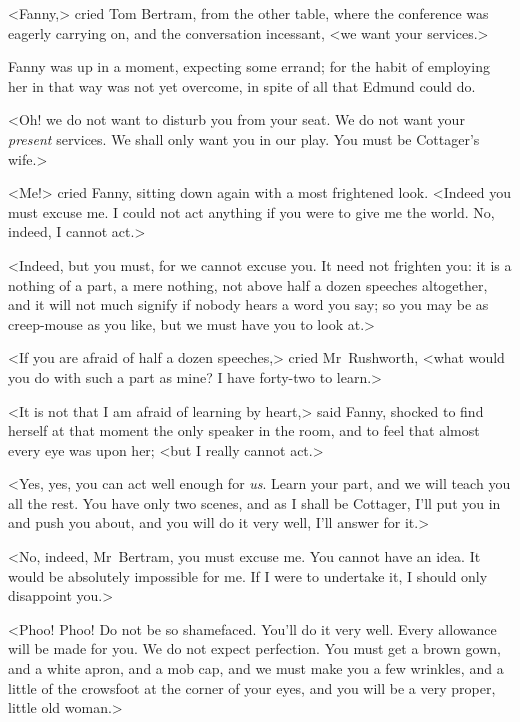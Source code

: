 <Fanny,> cried Tom Bertram, from the other table, where the conference was eagerly carrying on, and the conversation incessant, <we want your services.>

Fanny was up in a moment, expecting some errand; for the habit of employing her in that way was not yet overcome, in spite of all that Edmund could do.

<Oh! we do not want to disturb you from your seat. We do not want your \textit{present}  services. We shall only want you in our play. You must be Cottager's wife.>

<Me!> cried Fanny, sitting down again with a most frightened look. <Indeed you must excuse me. I could not act anything if you were to give me the world. No, indeed, I cannot act.>

<Indeed, but you must, for we cannot excuse you. It need not frighten you: it is a nothing of a part, a mere nothing, not above half a dozen speeches altogether, and it will not much signify if nobody hears a word you say; so you may be as creep-mouse as you like, but we must have you to look at.>

<If you are afraid of half a dozen speeches,> cried Mr~Rushworth, <what would you do with such a part as mine? I have forty-two to learn.>

<It is not that I am afraid of learning by heart,> said Fanny, shocked to find herself at that moment the only speaker in the room, and to feel that almost every eye was upon her; <but I really cannot act.>

<Yes, yes, you can act well enough for \textit{us}. Learn your part, and we will teach you all the rest. You have only two scenes, and as I shall be Cottager, I'll put you in and push you about, and you will do it very well, I'll answer for it.>

<No, indeed, Mr~Bertram, you must excuse me. You cannot have an idea. It would be absolutely impossible for me. If I were to undertake it, I should only disappoint you.>

<Phoo! Phoo! Do not be so shamefaced. You'll do it very well. Every allowance will be made for you. We do not expect perfection. You must get a brown gown, and a white apron, and a mob cap, and we must make you a few wrinkles, and a little of the crowsfoot at the corner of your eyes, and you will be a very proper, little old woman.>

